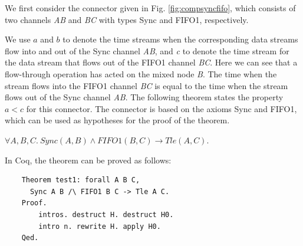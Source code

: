 \documentclass{llncs}
\begin{document}
\begin{example}
We first consider the connector given in Fig. \ref{fig:compsyncfifo}, which consists of two channels \emph{AB} and \emph{BC} with types Sync and FIFO1, respectively.  

We use $a$ and $b$ to denote the time streams when the corresponding data streams flow into and out of the Sync channel \emph{AB}, and
\emph{c} to denote the time stream for the data stream that flows out of the FIFO1 channel \emph{BC}. Here we can see that a flow-through
operation has acted on the mixed node \emph{B}. The time when the stream flows into the FIFO1 channel \emph{BC} is equal to the time when the
stream flows out of the Sync channel \emph{AB}. The following theorem states the property $a < c$ for this connector. The connector is based on the
axioms Sync and FIFO1, which can be used as hypotheses for the proof of the theorem.
\begin{theorem}\label{the:tleac}
$\forall A,B,C.\:Sync(A,B)\land FIFO1(B,C) \rightarrow Tle(A,C)$.
\end{theorem}

In Coq, the theorem can be proved as follows:
\begin{verbatim}
    Theorem test1: forall A B C,
      Sync A B /\ FIFO1 B C -> Tle A C.
    Proof.
        intros. destruct H. destruct H0.
        intro n. rewrite H. apply H0.
    Qed.
\end{verbatim}


\end{example}
\end{document}
